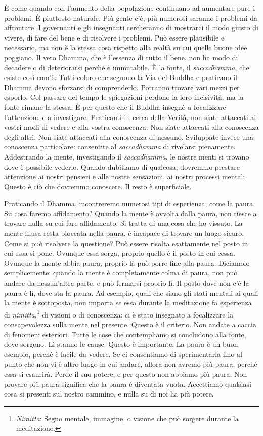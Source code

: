 È come quando con l'aumento della popolazione continuano ad aumentare
pure i problemi. È piuttosto naturale. Più gente c'è, più numerosi
saranno i problemi da affrontare. I governanti e gli insegnanti
cercheranno di mostrarci il modo giusto di vivere, di fare del bene e di
risolvere i problemi. Può essere plausibile e necessario, ma non è la
stessa cosa rispetto alla realtà su cui quelle buone idee poggiano. Il
vero Dhamma, che è l'essenza di tutto il bene, non ha modo di decadere o
di deteriorarsi perché è immutabile. È la fonte, il \emph{saccadhamma},
che esiste così com'è. Tutti coloro che seguono la Via del Buddha e
praticano il Dhamma devono sforzarsi di comprenderlo. Potranno trovare
vari mezzi per esporlo. Col passare del tempo le spiegazioni perdono la
loro incisività, ma la fonte rimane la stessa. È per questo che il
Buddha insegnò a focalizzare l'attenzione e a investigare. Praticanti in
cerca della Verità, non siate attaccati ai vostri modi di vedere e alla
vostra conoscenza. Non siate attaccati alla conoscenza degli altri. Non
siate attaccati alla conoscenza di nessuno. Sviluppate invece una
conoscenza particolare: consentite al \emph{saccadhamma} di rivelarsi
pienamente. Addestrando la mente, investigando il \emph{saccadhamma}, le
nostre menti si trovano dove è possibile vederlo. Quando dubitiamo di
qualcosa, dovremmo prestare attenzione ai nostri pensieri e alle nostre
sensazioni, ai nostri processi mentali. Questo è ciò che dovremmo
conoscere. Il resto è superficiale.

Praticando il Dhamma, incontreremo numerosi tipi di esperienza, come la
paura. Su cosa faremo affidamento? Quando la mente è avvolta dalla
paura, non riesce a trovare nulla su cui fare affidamento. Si tratta di
una cosa che ho vissuto. La mente illusa resta bloccata nella paura, è
incapace di trovare un luogo sicuro. Come si può risolvere la questione?
Può essere risolta esattamente nel posto in cui essa si pone. Ovunque
essa sorga, proprio quello è il posto in cui cessa. Ovunque la mente
abbia paura, proprio là può porre fine alla paura. Diciamolo
semplicemente: quando la mente è completamente colma di paura, non può
andare da nessun'altra parte, e può fermarsi proprio lì. Il posto dove
non c'è la paura è lì, dove sta la paura. Ad esempio, quali che siano
gli stati mentali ai quali la mente è sottoposta, non importa se essa
durante la meditazione fa esperienza di \emph{nimitta},\footnote{\emph{Nimitta}:
  Segno mentale, immagine, o visione che può sorgere durante la
  meditazione.} di visioni o di conoscenza: ci è stato insegnato a
focalizzare la consapevolezza sulla mente nel presente. Questo è il
criterio. Non andate a caccia di fenomeni esteriori. Tutte le cose che
contempliamo si concludono alla fonte, dove sorgono. Lì stanno le cause.
Questo è importante. La paura è un buon esempio, perché è facile da
vedere. Se ci consentiamo di sperimentarla fino al punto che non vi è
altro luogo in cui andare, allora non avremo più paura, perché essa si
esaurirà. Perde il suo potere, e per questo non abbiamo più paura. Non
provare più paura significa che la paura è diventata vuota. Accettiamo
qualsiasi cosa si presenti sul nostro cammino, e nulla su di noi ha più
potere.

